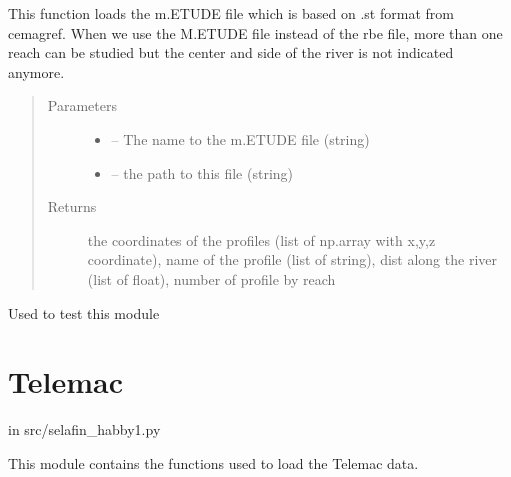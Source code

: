 \documentclass[letterpaper,10pt,english]{sphinxmanual}
\begin{document}

\begin{fulllineitems}
\label{\detokenize{index:src.rubar.m_file_load_coord_1d}}
This function loads the m.ETUDE file which is based on .st format from cemagref. When we use the M.ETUDE file
instead of the rbe file, more than one reach can be studied but the center and side of the river is not
indicated anymore.
\begin{quote}\begin{description}
\item[{Parameters}] \leavevmode\begin{itemize}
\item {} 
 -- The name to the m.ETUDE file (string)

\item {} 
 -- the path to this file (string)

\end{itemize}

\item[{Returns}] \leavevmode
the coordinates of the profiles (list of np.array with x,y,z coordinate), name of the profile
(list of string), dist along the river (list of float), number of profile by reach

\end{description}\end{quote}

\end{fulllineitems}


\begin{fulllineitems}
\label{\detokenize{index:src.rubar.main}}
Used to test this module

\end{fulllineitems}



\section{Telemac}
\label{\detokenize{index:telemac}}
in src/selafin\_habby1.py

This module contains the functions used to load the Telemac data.
\label{\detokenize{index:module-src.selafin_habby1}}
\end{document}
